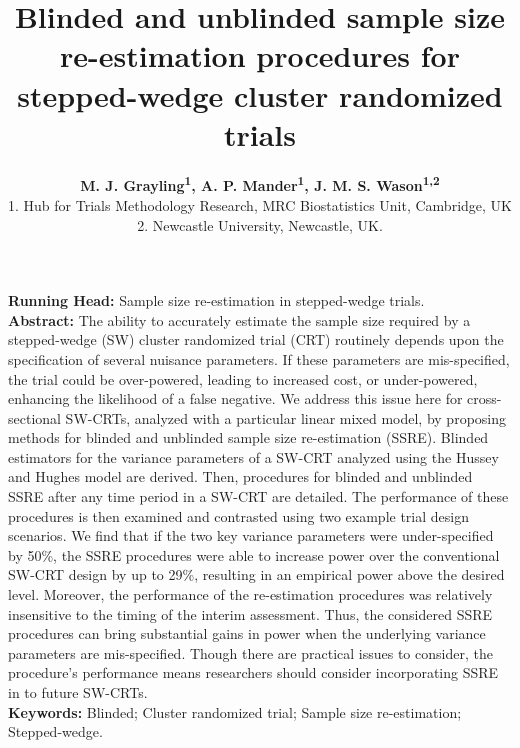 \documentclass{article}
\begin{document}
\title{\textbf{Blinded and unblinded sample size re-estimation procedures for stepped-wedge cluster randomized trials}}
\author{\textbf{M. J. Grayling\textsuperscript{1}, A. P. Mander\textsuperscript{1}, J. M. S. Wason\textsuperscript{1,2}}\\
\small 1. Hub for Trials Methodology Research, MRC Biostatistics Unit, Cambridge, UK\\ \small 2. Newcastle University, Newcastle, UK.}
\date{}
\maketitle

\noindent \textbf{Running Head:} Sample size re-estimation in stepped-wedge trials.\\

\noindent \textbf{Abstract:} The ability to accurately estimate the sample size required by a stepped-wedge (SW) cluster randomized trial (CRT) routinely depends upon the specification of several nuisance parameters. If these parameters are mis-specified, the trial could be over-powered, leading to increased cost, or under-powered, enhancing the likelihood of a false negative. We address this issue here for cross-sectional SW-CRTs, analyzed with a particular linear mixed model, by proposing methods for blinded and unblinded sample size re-estimation (SSRE). Blinded estimators for the variance parameters of a SW-CRT analyzed using the Hussey and Hughes model are derived. Then, procedures for blinded and unblinded SSRE after any time period in a SW-CRT are detailed. The performance of these procedures is then examined and contrasted using two example trial design scenarios. We find that if the two key variance parameters were under-specified by 50\%, the SSRE procedures were able to increase power over the conventional SW-CRT design by up to 29\%, resulting in an empirical power above the desired level. Moreover, the performance of the re-estimation procedures was relatively insensitive to the timing of the interim assessment. Thus, the considered SSRE procedures can bring substantial gains in power when the underlying variance parameters are mis-specified. Though there are practical issues to consider, the procedure's performance means researchers should consider incorporating SSRE in to future SW-CRTs. \\

\noindent \textbf{Keywords:} Blinded; Cluster randomized trial; Sample size re-estimation; Stepped-wedge.\\
\end{document}
